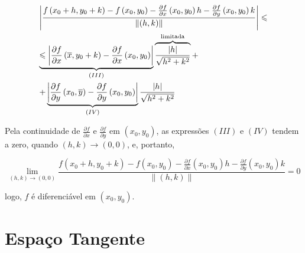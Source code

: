 \documentclass[11pt, oneside, a4paper]{gsm-l}
\begin{document}
\begin{dem}
\[
\begin{gathered}
  \left| {\frac{{f\left( {x_0  + h,y_0  + k} \right) - f\left( {x_0 ,y_0 } \right) - \frac{{\partial f}}
{{\partial x}}\left( {x_0 ,y_0 } \right)h - \frac{{\partial f}}
{{\partial y}}\left( {x_0 ,y_0 } \right)k}}
{{\left\| {\left( {h,k} \right)} \right\|}}} \right| \leqslant  \hfill \\
\underbrace { \leqslant \left| {\frac{{\partial f}}
{{\partial x}}\left( {\overline x ,y_0  + k} \right) - \frac{{\partial f}}
{{\partial x}}\left( {x_0 ,y_0 } \right)} \right|}_{\left( {III} \right)}\overbrace {\frac{{\left| h \right|}}
{{\sqrt {h^2  + k^2 } }}}^{{\text{limitada}}} +  \hfill \\
+ \underbrace {\left| {\frac{{\partial f}}
{{\partial y}}\left( {x_0 ,\overline y } \right) - \frac{{\partial f}}
{{\partial y}}\left( {x_0 ,y_0 } \right)} \right|}_{\left( {IV} \right)}\frac{{\left| h \right|}}
{{\sqrt {h^2  + k^2 } }} \hfill \\
\end{gathered}
\]

    Pela continuidade de $\frac{{\partial f}}{{\partial x}}$ e $\frac{{\partial f}}{{\partial y}}$ em $\left( {x_0 ,y_0 } \right)$, as expressões $(III)$ e $(IV)$ tendem a zero, quando $\left( {h,k} \right) \to \left( {0,0} \right)$, e, portanto,

\[
\mathop {\lim }\limits_{\left( {h,k} \right) \to \left( {0,0} \right)} \frac{{f\left( {x_0  + h,y_0  + k} \right) - f\left( {x_0 ,y_0 } \right) - \frac{{\partial f}}
{{\partial x}}\left( {x_0 ,y_0 } \right)h - \frac{{\partial f}}
{{\partial y}}\left( {x_0 ,y_0 } \right)k}}
{{\left\| {\left( {h,k} \right)} \right\|}} = 0
\]

logo, $f$ é diferenciável em $\left( {x_0 ,y_0 } \right)$.

\end{dem}

\section{Espaço Tangente} \label{sec15}
\end{document}
